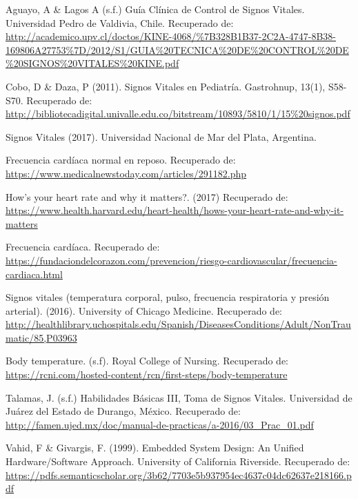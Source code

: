 \begin{thebibliography}{0}
	
	
	 Aguayo, A \& Lagos A (s.f.) Guía Clínica de Control de Signos Vitales. Universidad Pedro de Valdivia, Chile. Recuperado de: \url{http://academico.upv.cl/doctos/KINE-4068/\%7B328B1B37-2C2A-4747-8B38-169806A27753%7D/2012/S1/GUIA%20TECNICA%20DE%20CONTROL%20DE%20SIGNOS%20VITALES%20KINE.pdf}
	
	 Cobo, D \& Daza, P (2011). Signos Vitales en Pediatría. Gastrohnup, 13(1), S58-S70. Recuperado de: \url{http://bibliotecadigital.univalle.edu.co/bitstream/10893/5810/1/15%20signos.pdf} 
		
	 Signos Vitales (2017). Universidad Nacional de Mar del Plata, Argentina. 
		
	 Frecuencia cardíaca normal en reposo. Recuperado de: \url{https://www.medicalnewstoday.com/articles/291182.php}
	
	 How’s your heart rate and why it matters?. (2017) Recuperado de: \url{https://www.health.harvard.edu/heart-health/hows-your-heart-rate-and-why-it-matters}

	 Frecuencia cardíaca. Recuperado de: \url{https://fundaciondelcorazon.com/prevencion/riesgo-cardiovascular/frecuencia-cardiaca.html}

	
	
	 Signos vitales (temperatura corporal, pulso, frecuencia respiratoria y presión arterial). (2016). University of Chicago Medicine. Recuperado de: \url{http://healthlibrary.uchospitals.edu/Spanish/DiseasesConditions/Adult/NonTraumatic/85,P03963}
	
	 Body temperature. (s.f). Royal College of Nursing. Recuperado de: \url{https://rcni.com/hosted-content/rcn/first-steps/body-temperature}
	
	 Talamas, J. (s.f.) Habilidades Básicas III, Toma de Signos Vitales. Universidad de Juárez del Estado de Durango, México. Recuperado de: \url{http://famen.ujed.mx/doc/manual-de-practicas/a-2016/03_Prac_01.pdf}
	
		Vahid, F \& Givargis, F. (1999). Embedded System Design: An Unified Hardware/Software Approach. University of California Riverside. Recuperado de: \url{https://pdfs.semanticscholar.org/3b62/7703e5b937954ec4637c04dc62637e218166.pdf}
	

\end{thebibliography}
